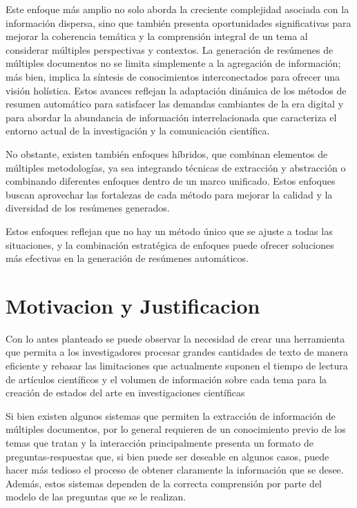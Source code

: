     Este enfoque más amplio no solo aborda la creciente complejidad asociada con la información dispersa, sino que también presenta oportunidades significativas para mejorar la coherencia temática y la comprensión integral de un tema al considerar múltiples perspectivas y contextos.
    La generación de resúmenes de múltiples documentos no se limita simplemente a la agregación de información; más bien, implica la síntesis de conocimientos interconectados para ofrecer una visión holística. 
    Estos avances reflejan la adaptación dinámica de los métodos de resumen automático para satisfacer las demandas cambiantes de la era digital y para abordar la abundancia de información interrelacionada que caracteriza el entorno actual de la investigación y la comunicación científica.

    No obstante, existen también enfoques híbridos, que combinan elementos de múltiples metodologías, ya sea integrando técnicas de extracción y abstracción o combinando diferentes enfoques dentro de un marco unificado. Estos enfoques buscan aprovechar las fortalezas de cada método para mejorar la calidad y la diversidad de los resúmenes generados.
    
    Estos enfoques reflejan que no hay un método único que se ajuste a todas las situaciones, y la combinación estratégica de enfoques puede ofrecer soluciones más efectivas en la generación de resúmenes automáticos.



\section{Motivacion y Justificacion}

    Con lo antes planteado se puede observar la necesidad de crear una herramienta que permita a los investigadores procesar grandes cantidades de texto de manera eficiente y rebasar las limitaciones que actualmente suponen el tiempo de lectura de artículos científicos y el volumen de información sobre cada tema para la creación de estados del arte en investigaciones científicas


    Si bien existen algunos sistemas\cite{elicit, scite} que permiten la extracción de información de múltiples documentos, por lo general requieren de un conocimiento previo de los temas que tratan y la interacción principalmente presenta un formato de preguntas-respuestas que, si bien puede ser deseable en algunos casos, puede hacer más tedioso el proceso de obtener claramente la información que se desee. Además, estos sistemas dependen de la correcta comprensión por parte del modelo de las preguntas que se le realizan.

